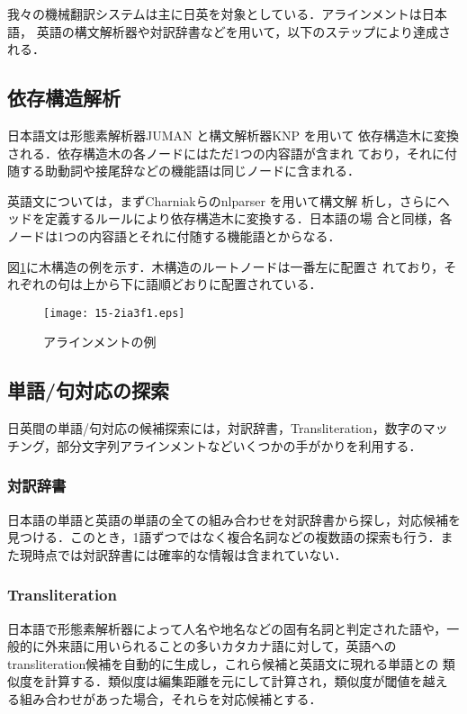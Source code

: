 \documentclass[japanese]{jnlp_1.4}
\begin{document}
我々の機械翻訳システムは主に日英を対象としている．アラインメントは日本語，
英語の構文解析器や対訳辞書などを用いて，以下のステップにより達成される．


\subsection{依存構造解析}

日本語文は形態素解析器JUMAN \cite{JUMAN}と構文解析器KNP \cite{KNP}を用いて
依存構造木に変換される．依存構造木の各ノードにはただ1つの内容語が含まれ
ており，それに付随する助動詞や接尾辞などの機能語は同じノードに含まれる．


英語文については，まずCharniakらのnlparser \cite{Charniak}を用いて構文解
析し，さらにヘッドを定義するルールにより依存構造木に変換する．日本語の場
合と同様，各ノードは1つの内容語とそれに付随する機能語とからなる．


図\ref{fig:Amb}に木構造の例を示す．木構造のルートノードは一番左に配置さ
れており，それぞれの句は上から下に語順どおりに配置されている．


\begin{figure}[t]
 \begin{center}
  \texttt{[image: 15-2ia3f1.eps]}
  \caption{アラインメントの例}
  \label{fig:Amb}
 \end{center}
\end{figure}

\subsection{単語/句対応の探索}
\label{alignment}

日英間の単語/句対応の候補探索には，対訳辞書，Transliteration，数字のマッ
チング，部分文字列アラインメントなどいくつかの手がかりを利用する．


\subsubsection{対訳辞書}

日本語の単語と英語の単語の全ての組み合わせを対訳辞書から探し，対応候補を
見つける．このとき，1語ずつではなく複合名詞などの複数語の探索も行う．ま
た現時点では対訳辞書には確率的な情報は含まれていない．


\subsubsection{Transliteration}

日本語で形態素解析器によって人名や地名などの固有名詞と判定された語や，一
般的に外来語に用いられることの多いカタカナ語に対して，英語への
transliteration候補を自動的に生成し，これら候補と英語文に現れる単語との
類似度を計算する．類似度は編集距離を元にして計算され，類似度が閾値を越え
る組み合わせがあった場合，それらを対応候補とする．
\end{document}
